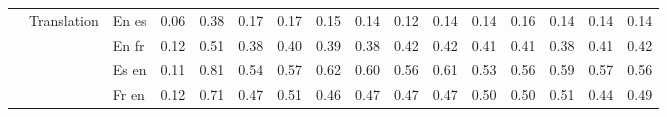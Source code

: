 \begin{center}
\begin{longtable}{lllrrrrrrrrrrrrr}
\cline{2-16}
 & \multirow[t]{4}{*}{Translation} & En es & 0.06 & 0.38 & 0.17 & 0.17 & 0.15 & 0.14 & 0.12 & 0.14 & 0.14 & 0.16 & 0.14 & 0.14 & 0.14 \\
 &  & En fr & 0.12 & 0.51 & 0.38 & 0.40 & 0.39 & 0.38 & 0.42 & 0.42 & 0.41 & 0.41 & 0.38 & 0.41 & 0.42 \\
 &  & Es en & 0.11 & 0.81 & 0.54 & 0.57 & 0.62 & 0.60 & 0.56 & 0.61 & 0.53 & 0.56 & 0.59 & 0.57 & 0.56 \\
 &  & Fr en & 0.12 & 0.71 & 0.47 & 0.51 & 0.46 & 0.47 & 0.47 & 0.47 & 0.50 & 0.50 & 0.51 & 0.44 & 0.49 \\
\cline{1-16} \cline{2-16}
\bottomrule
\end{longtable}

\end{center}
\twocolumn